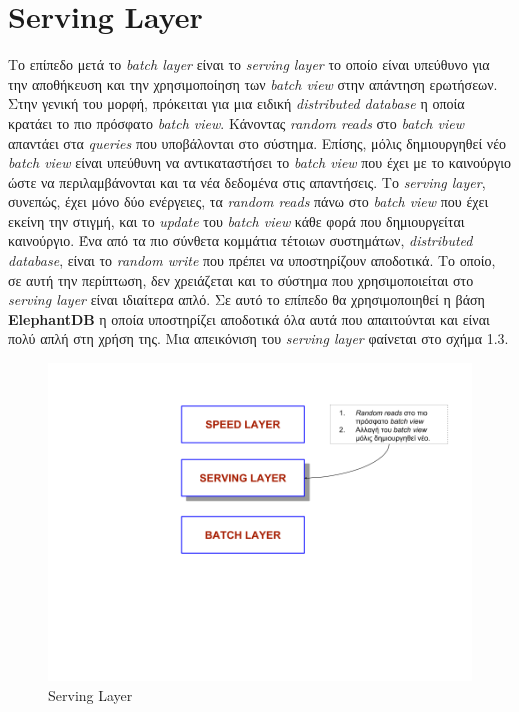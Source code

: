 \section{Serving Layer}
Το επίπεδο μετά το \textit{batch layer} είναι το \textit{serving layer} το οποίο είναι υπεύθυνο για την αποθήκευση και την χρησιμοποίηση των \textit{batch view} στην απάντηση ερωτήσεων. Στην γενική του μορφή, πρόκειται για μια ειδική \textit{distributed database} η οποία κρατάει το πιο πρόσφατο \textit{batch view}. Κάνοντας \textit{random reads} στο \textit{batch view} απαντάει στα \textit{queries} που υποβάλονται στο σύστημα. Επίσης, μόλις δημιουργηθεί νέο \textit{batch view} είναι υπεύθυνη να αντικαταστήσει το \textit{batch view} που έχει με το καινούργιο ώστε να περιλαμβάνονται και τα νέα δεδομένα στις απαντήσεις.
\newline
Το \textit{serving layer}, συνεπώς, έχει μόνο δύο ενέργειες, τα \textit{random reads} πάνω στο \textit{batch view} που έχει εκείνη την στιγμή, και το \textit{update} του \textit{batch view} κάθε φορά που δημιουργείται καινούργιο. Ένα από τα πιο σύνθετα κομμάτια τέτοιων συστημάτων, \textit{distributed database}, είναι το \textit{random write} που πρέπει να υποστηρίζουν αποδοτικά. Το οποίο, σε αυτή την περίπτωση, δεν χρειάζεται και το σύστημα που χρησιμοποιείται στο  \textit{serving layer} είναι ιδιαίτερα απλό. Σε αυτό το επίπεδο θα χρησιμοποιηθεί η βάση \textbf{ElephantDB} η οποία υποστηρίζει αποδοτικά όλα αυτά που απαιτούνται και είναι πολύ απλή στη χρήση της.
\newline
Μια απεικόνιση του \textit{serving layer} φαίνεται στο σχήμα 1.3.
\begin{figure}[t]
\caption{Serving Layer}
\includegraphics[width=15cm]{images/serving_layer.png}
\centering
\end{figure}
\clearpage


